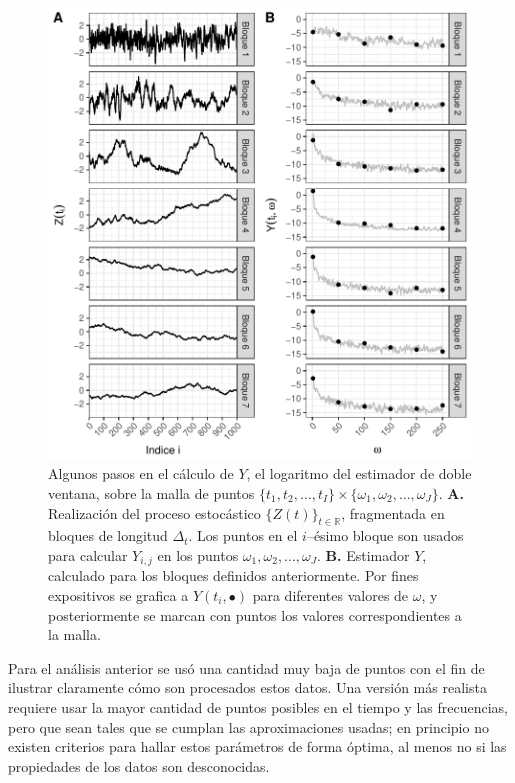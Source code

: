 \documentclass[12pt,letterpaper]{book}
\newcommand{\R}{\mathbb{R}}
\begin{document}
\begin{figure}
\centering
\includegraphics[width=\linewidth]{./scripts_graf_res/proceso_Z_fragmentado_doble.pdf}
\caption{Algunos pasos en el cálculo de $Y$, el logaritmo del estimador de doble ventana, sobre la malla de puntos $\{ t_1, t_2, \dots, t_I\} \times \{\omega_1, \omega_2, \dots, \omega_J\}$.
\textbf{A.}
Realización del proceso estocástico $\{Z(t)\}_{t\in\R}$, fragmentada en bloques de longitud $\Delta_t$. 
%
Los puntos en el $i$--ésimo bloque son usados para calcular $Y_{i,j}$
en los puntos $\omega_1, \omega_2, \dots, \omega_J$.
\textbf{B.}
Estimador $Y$, calculado para los bloques definidos anteriormente.
%
Por fines expositivos
se grafica a $Y(t_i,\bullet)$ para diferentes valores de $\omega$, y posteriormente se marcan con puntos los valores correspondientes a la malla.}
\label{fig:proceso_psr}
\end{figure}

Para el análisis anterior se usó una cantidad muy baja de puntos con el fin de ilustrar claramente cómo son procesados estos datos.
%
Una versión más realista requiere usar la mayor cantidad de puntos posibles en el tiempo y las frecuencias, pero que sean tales que se cumplan las aproximaciones usadas;
en principio no existen criterios para hallar estos parámetros de forma óptima, al menos no si las propiedades de los datos son desconocidas.
\end{document}
